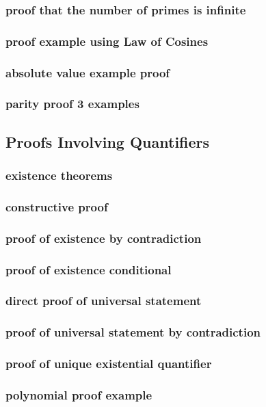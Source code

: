 \documentclass[a4paper]{article}
\begin{document}
\subsubsection*{proof that the number of primes is infinite}
\subsubsection*{proof example using Law of Cosines}
\subsubsection*{absolute value example proof}
\subsubsection*{parity proof 3 examples}

\newpage
\subsection{Proofs Involving Quantifiers}   %
\subsubsection*{existence theorems}
\subsubsection*{constructive proof}
\subsubsection*{proof of existence by contradiction}
\subsubsection*{proof of existence conditional}
\subsubsection*{direct proof of universal statement}
\subsubsection*{proof of universal statement by contradiction}
\subsubsection*{proof of unique existential quantifier}
\subsubsection*{polynomial proof example}
\end{document}
